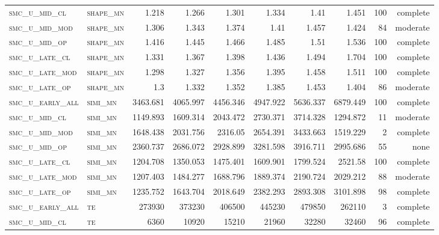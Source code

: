 \begin{landscape}
\begin{center}
\begin{footnotesize}
\begin{longtable}{llrrrrr|rrr}
\textsc{smc\_u\_mid\_cl   } & \textsc{shape\_mn }   & 1.218    & 1.266    & 1.301    & 1.334    & 1.41     & 1.451    & 100 & complete \\
\textsc{smc\_u\_mid\_mod  } & \textsc{shape\_mn }   & 1.306    & 1.343    & 1.374    & 1.41     & 1.457    & 1.424    & 84  & moderate \\
\textsc{smc\_u\_mid\_op   } & \textsc{shape\_mn }   & 1.416    & 1.445    & 1.466    & 1.485    & 1.51     & 1.536    & 100 & complete \\
\textsc{smc\_u\_late\_cl  } & \textsc{shape\_mn }   & 1.331    & 1.367    & 1.398    & 1.436    & 1.494    & 1.704    & 100 & complete \\
\textsc{smc\_u\_late\_mod } & \textsc{shape\_mn }   & 1.298    & 1.327    & 1.356    & 1.395    & 1.458    & 1.511    & 100 & complete \\
\textsc{smc\_u\_late\_op  } & \textsc{shape\_mn }   & 1.3      & 1.332    & 1.352    & 1.385    & 1.453    & 1.404    & 86  & moderate \\
\textsc{smc\_u\_early\_all} & \textsc{simi\_mn  }   & 3463.681 & 4065.997 & 4456.346 & 4947.922 & 5636.337 & 6879.449 & 100 & complete \\
\textsc{smc\_u\_mid\_cl   } & \textsc{simi\_mn  }   & 1149.893 & 1609.314 & 2043.472 & 2730.371 & 3714.328 & 1294.872 & 11  & moderate \\
\textsc{smc\_u\_mid\_mod  } & \textsc{simi\_mn  }   & 1648.438 & 2031.756 & 2316.05  & 2654.391 & 3433.663 & 1519.229 & 2   & complete \\
\textsc{smc\_u\_mid\_op   } & \textsc{simi\_mn  }   & 2360.737 & 2686.072 & 2928.899 & 3281.598 & 3916.711 & 2995.686 & 55  & none     \\
\textsc{smc\_u\_late\_cl  } & \textsc{simi\_mn  }   & 1204.708 & 1350.053 & 1475.401 & 1609.901 & 1799.524 & 2521.58  & 100 & complete \\
\textsc{smc\_u\_late\_mod } & \textsc{simi\_mn  }   & 1207.403 & 1484.277 & 1688.796 & 1889.374 & 2190.724 & 2029.212 & 88  & moderate \\
\textsc{smc\_u\_late\_op  } & \textsc{simi\_mn  }   & 1235.752 & 1643.704 & 2018.649 & 2382.293 & 2893.308 & 3101.898 & 98  & complete \\
\textsc{smc\_u\_early\_all} & \textsc{te  	    }   & 273930   & 373230   & 406500   & 445230   & 479850   & 262110   & 3   & complete \\
\textsc{smc\_u\_mid\_cl   } & \textsc{te        }   & 6360     & 10920    & 15210    & 21960    & 32280    & 32460    & 96  & complete \\

\end{longtable}
\end{footnotesize}
\end{center}
\end{landscape}

